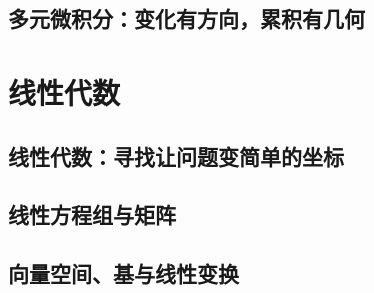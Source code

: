 \documentclass[UTF8,openany]{ctexbook}
\theoremstyle{definition}
\theoremstyle{plain}
\begin{document}
\chapter*{多元微积分：变化有方向，累积有几何}
\label{ch:014}










\clearpage
\part{线性代数}
\chapter*{线性代数：寻找让问题变简单的坐标}
\label{ch:015}

\clearpage
\chapter*{线性方程组与矩阵}
\label{ch:016}




\clearpage
\chapter*{向量空间、基与线性变换}
\label{ch:017}





\clearpage
\end{document}
